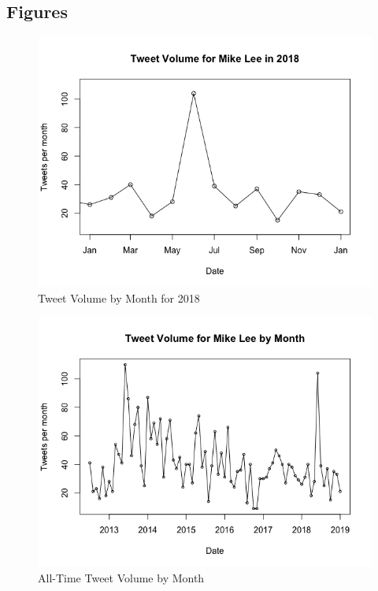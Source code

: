 \documentclass{article}
\begin{document}
\subsection{Figures}
\begin{figure}[h!]
\includegraphics[width =\textwidth]{image/tweet_volume_2018.png}
\caption{Tweet Volume by Month for 2018}
\centering
\end{figure}
\begin{figure}[h!]
\includegraphics[width =\textwidth]{image/tweet_volume_alltime.png}
\caption{All-Time Tweet Volume by Month}
\centering
\end{figure}
\end{document}
